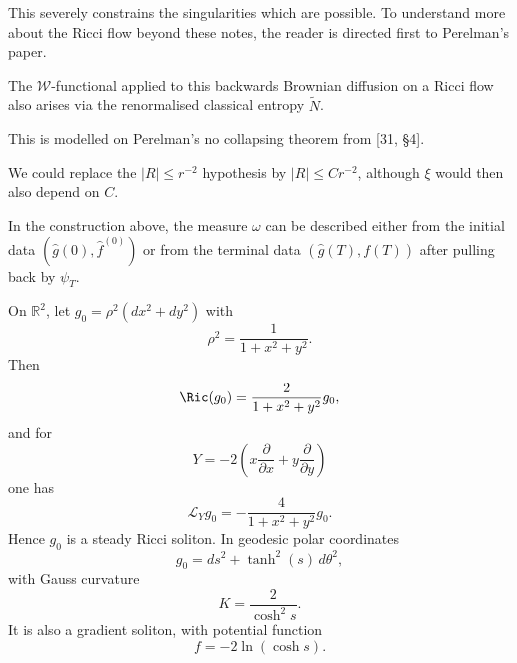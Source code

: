 %
%

\begin{remark}
\label{topping-ch10-perelman-reference}
This severely constrains the singularities which are possible. To understand
more about the Ricci flow beyond these notes, the reader is directed first to
Perelman's paper.
\end{remark}

\begin{remark}
\label{topping-ch8-classical-entropy-link}
The $\mathcal W$-functional applied to this backwards Brownian diffusion on a
Ricci flow also arises via the renormalised classical entropy $\tilde N$.
\end{remark}

\begin{remark}
\label{topping-ch8-no-collapsing-perelman}
This is modelled on Perelman's no collapsing theorem from [31, \S4].
\end{remark}

\begin{remark}
\label{topping-ch8-no-collapsing-variant}
We could replace the $|R| \le r^{-2}$ hypothesis by $|R| \le C r^{-2}$,
although $\xi$ would then also depend on $C$.
\end{remark}

\begin{remark}
\label{topping-gradient-flow-volume-preserving-remark}
In the construction above, the measure $\omega$ can be described either from the initial data $(\hat g(0),\hat f^{(0)})$ or from the terminal data $(\hat g(T),f(T))$ after pulling back by $\psi_T$.
\end{remark}

\begin{example}
\label{topping-intro-cigar-soliton}
On $\mathbb R^2$, let $g_0=\rho^2(dx^2+dy^2)$ with
\[
\rho^2=\frac{1}{1+x^2+y^2}.
\]
Then
\[
\Ric(g_0)=\frac{2}{1+x^2+y^2}g_0,
\]
and for
\[
Y=-2\!\left(x\frac{\partial}{\partial x}+y\frac{\partial}{\partial y}\right)
\]
one has
\[
\mathcal L_Y g_0=-\frac{4}{1+x^2+y^2}g_0.
\]
Hence $g_0$ is a steady Ricci soliton. In geodesic polar coordinates
\[
g_0=ds^2+\tanh^2(s)\,d\theta^2,
\]
with Gauss curvature
\[
K=\frac{2}{\cosh^2 s}.
\]
It is also a gradient soliton, with potential function
\[
f=-2\ln(\cosh s).
\]
\end{example}

